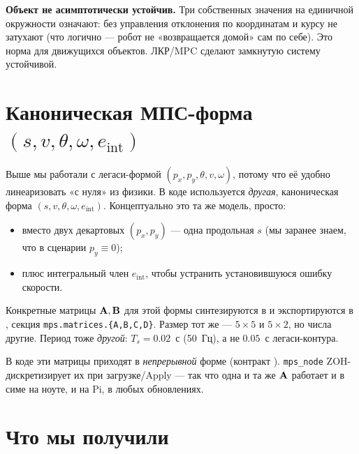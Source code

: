\begin{warnbox}
\textbf{Объект не асимптотически устойчив.} Три собственных значения
на единичной окружности означают: без управления отклонения по координатам
и курсу не затухают (что логично --- робот не «возвращается домой» сам
по себе). Это норма для движущихся объектов. ЛКР/MPC сделают замкнутую
систему устойчивой.
\end{warnbox}

\section{Каноническая МПС-форма $(s, v, \theta, \omega, e_\text{int})$}

Выше мы работали с легаси-формой $(p_x, p_y, \theta, v, \omega)$,
потому что её удобно линеаризовать «с нуля» из физики. В коде
 используется \emph{другая}, каноническая форма
$(s, v, \theta, \omega, e_\text{int})$. Концептуально это та же модель,
просто:

\begin{itemize}
  \item вместо двух декартовых $(p_x, p_y)$ --- одна продольная $s$
        (мы заранее знаем, что в сценарии $p_y \equiv 0$);
  \item плюс интегральный член $e_\text{int}$, чтобы устранить
        установившуюся ошибку скорости.
\end{itemize}

Конкретные матрицы $\mathbf{A}, \mathbf{B}$ для этой формы синтезируются
в  и экспортируются в ,
секция \texttt{mps.matrices.\{A,B,C,D\}}. Размер тот же ---  $5 \times 5$ и $5
\times 2$, но числа другие. Период тоже \emph{другой}: $T_s = 0.02$~с
(50~Гц), а не $0.05$~с легаси-контура.

\begin{notebox}
В коде эти матрицы приходят в \emph{непрерывной} форме (контракт
). \texttt{mps\_node} ZOH-дискретизирует их
при загрузке/Apply --- так что одна и та же $\mathbf{A}$ работает
и в симе на ноуте, и на Pi, в любых обновлениях.
\end{notebox}

\section{Что мы получили}


